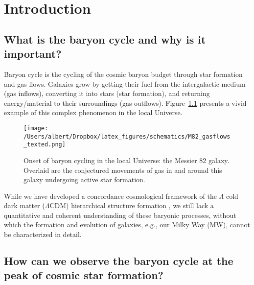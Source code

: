 
\chapter{Introduction}

\section{What is the baryon cycle and why is it important?}

Baryon cycle is the cycling of the cosmic baryon budget through star formation and gas flows. Galaxies grow by
getting their fuel from the intergalactic medium (gas inflows), converting it into stars (star formation), and
returning energy/material to their surroundings (gas outflows). Figure~\ref{fig:M82} presents a vivid example of
this complex phenomenon in the local Universe.
\begin{figure}
    \centering
    \texttt{[image: /Users/albert/Dropbox/latex\_figures/schematics/M82\_gasflows\_texted.png]}
    \caption[Onset of baryon cycling in the local Universe: M82.]{Onset of baryon cycling in the local Universe: the Messier 82
    galaxy. Overlaid are the conjectured movements of gas in and around this galaxy undergoing active star
    formation.
    \label{fig:M82}}
\end{figure}
While we have developed a concordance cosmological framework of the $\Lambda$ cold dark matter ($\Lambda$CDM)
hierarchical structure formation \citep[see \eg][and references therein]{PlanckCollaboration:2018va}, 
we still lack a quantitative and coherent understanding of these baryonic
processes, without which the formation and evolution of galaxies, e.g., our Milky Way (MW), cannot be
characterized in detail.

\section{How can we observe the baryon cycle at the peak of cosmic star formation?}

